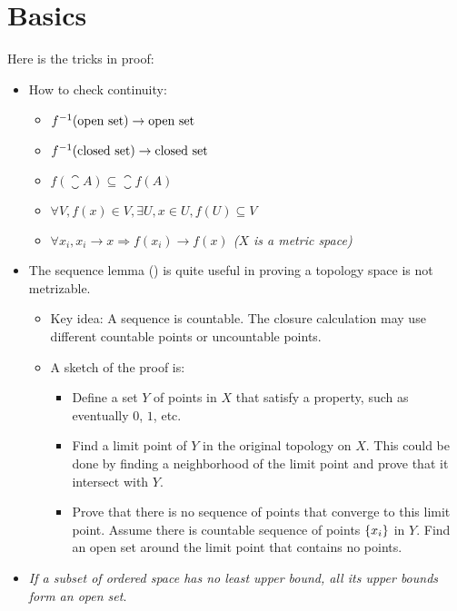 \chapter{Basics}

Here is the tricks in proof:
\begin{itemize}
    \item How to check continuity:
\begin{itemize}
    \item ${f}^{-1}(\text{open set}) \rightarrow \text{open set}$
    \item ${f}^{-1}(\text{closed set}) \rightarrow \text{closed set}$
    \item $f(\closure{A}) \subseteq \closure{f(A)}$
    \item $\forall V, f(x) \in V, \exists U, x\in U, f(U) \subseteq V$
    \item \emph{$\forall x_i, x_i \rightarrow x \Rightarrow f(x_i) \rightarrow f(x)$ ($X$ is a metric space)}
\end{itemize}
    \item The sequence lemma () is quite useful in proving a topology space is not metrizable.
        \begin{itemize}
            \item Key idea: A sequence is countable. The closure calculation may use different countable points or uncountable points.
            \item A sketch of the proof is:
            \begin{itemize}
                \item Define a set $Y$ of points in $X$ that satisfy a property, such as eventually $0$, $1$, etc.
                \item Find a limit point of $Y$ in the original topology on $X$. This could be done by finding a neighborhood of the limit point and prove that it intersect with $Y$.
                \item Prove that there is no sequence of points that converge to this limit point. Assume there is countable sequence of points $\set{x_i}$ in $Y$. Find an open set around the limit point that contains no points.
            \end{itemize}
        \end{itemize}
    
    \item \emph{If a subset of ordered space has no least upper bound, all its upper bounds form an open set}.
\end{itemize}


